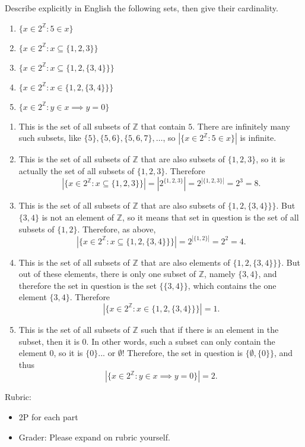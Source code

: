 \documentclass{article}
\newcommand{\Z}{\mathbb{Z}}
\theoremstyle{definition}
\begin{document}
\begin{question}{10}
Describe explicitly in English the following sets, then give their cardinality.

\begin{enumerate}
	\item $\{x \in 2^{\Z} : 5 \in x \}$
	\item $\{x \in 2^{\Z} : x \subseteq \{ 1, 2, 3\} \}$
	\item $\{x \in 2^{\Z} : x \subseteq \{ 1, 2, \{3, 4\} \} \}$
	\item $\{x \in 2^{\Z} : x \in \{ 1, 2, \{3, 4\} \} \}$
	\item $\{x \in 2^{\Z} : y \in x \implies y = 0 \}$
\end{enumerate}
\end{question}
\begin{solution}
\begin{enumerate}
	\item This is the set of all subsets of $\Z$ that contain $5$. There are infinitely many such subsets, like $\{5\}, \{5,6\}, \{5,6, 7\}, \dots$, so $\left | \{x \in 2^{\Z} : 5 \in x \} \right |$ is infinite.
	\item This is the set of all subsets of $\Z$ that are also subsets of $\{1, 2, 3\}$, so it is actually the set of all subsets of $\{1,2,3\}$. Therefore
	\[
	\left |\{x \in 2^{\Z} : x \subseteq \{ 1, 2, 3\} \} \right | = \left | 2^{\{1, 2, 3\}} \right | = 2^{|\{ 1, 2, 3\}|} = 2^3 = 8.
	\]
	
	\item This is the set of all subsets of $\Z$ that are also subsets of $ \{ 1, 2, \{3, 4\} \} \}$. But $\{ 3, 4 \}$ is not an element of $\Z$, so it means that set in question is the set of all subsets of $\{1,2\}$. Therefore, as above, 
	\[
	\left |\{x \in 2^{\Z} : x \subseteq \{ 1, 2, \{3, 4\} \} \} \right | = 2^{|\{1,2 \}|} = 2^2 = 4.
	\]
	
	\item This is the set of all subsets of $\Z$ that are also elements of $ \{ 1, 2, \{3, 4\} \} \}$. But out of these elements, there is only one subset of $\Z$, namely $\{ 3, 4 \}$, and therefore the set in question is the set $\{ \{3,4\} \}$, which contains the one element $\{3,4\}$. Therefore
	\[
	\left | \{x \in 2^{\Z} : x \in \{ 1, 2, \{3, 4\} \} \} \right | = 1.
	\]
	
	\item This is the set of all subsets of $\Z$ such that if there is an element in the subset, then it is $0$. In other words, such a subset can only contain the element $0$, so it is $\{ 0 \}$... or $\emptyset$! Therefore, the set in question is $\{ \emptyset, \{0\}\}$, and thus
	\[
	\left | \{x \in 2^{\Z} : y \in x \implies y = 0 \} \right | = 2.
	\]
\end{enumerate}
{\color{red} Rubric:
\begin{itemize}
\item 2P for each part
\item Grader: Please expand on rubric yourself.
\end{itemize}}
\end{solution}
\end{document}
